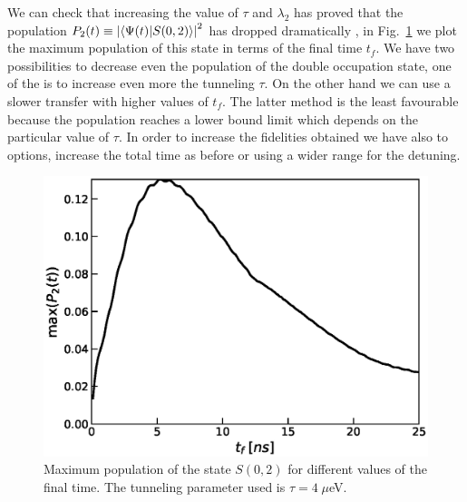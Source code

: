 \documentclass[a4paper,11pt]{article}
\begin{document}
We can check that increasing the value of $\tau$ and $\lambda_2$ has proved that the population $P_2(t)\equiv \abs{\braket{\Psi(t)}{S(0,2)}}^2$ has dropped  dramatically , in Fig.~\ref{fig:max_pop_S22} we plot the maximum population of this state in terms of the final time $t_f$. We have two possibilities to decrease even the population of the double occupation state, one of the is to increase even more the tunneling $\tau$. On the other hand we can use a slower transfer with higher values of $t_f$. The latter method is the least favourable because the population reaches a lower bound limit which depends on the particular value of $\tau$. In order to increase the fidelities obtained we have also to options, increase the total time as before or using a wider range for the detuning.
\begin{figure}[!htbp]
	\centering
	\includegraphics[width=0.7\linewidth]{max_pop_S22.eps}
	\caption{Maximum population of the state $S(0,2)$ for different values of the final time. The tunneling parameter used is $\tau=4\; \mu$eV.}
	\label{fig:max_pop_S22}
\end{figure}\\
\end{document}
